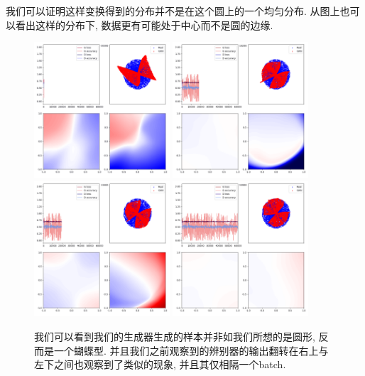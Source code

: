 \documentclass[lang=cn,11pt]{elegantpaper}
\begin{document}
我们可以证明这样变换得到的分布并不是在这个圆上的一个均匀分布. 从图上也可以看出这样的分布下, 数据更有可能处于中心而不是圆的边缘.

\begin{figure}[hbt]
  \includegraphics[width=0.45\textwidth]{circle_2_1}
  \includegraphics[width=0.45\textwidth]{circle_2_2}\\
  \includegraphics[width=0.45\textwidth]{circle_2_3}
  \includegraphics[width=0.45\textwidth]{circle_2_4}
  \caption{我们可以看到我们的生成器生成的样本并非如我们所想的是圆形, 反而是一个蝴蝶型. 并且我们之前观察到的辨别器的输出翻转在右上与左下之间也观察到了类似的现象, 并且其仅相隔一个batch.}
\end{figure}
\end{document}
